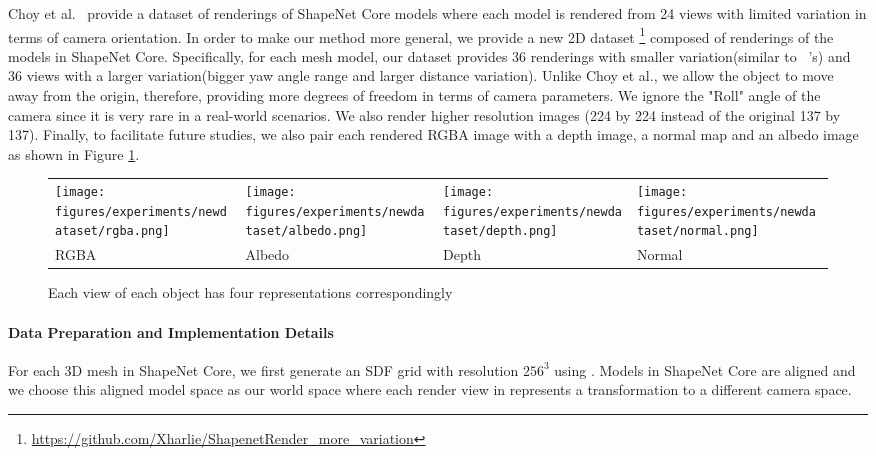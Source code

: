 \vspace{-5pt}
Choy et al.~\cite{choy20163d} provide a dataset of renderings of ShapeNet Core models where each model is rendered from 24 views with limited variation in terms of camera orientation. In order to make our method more general, we provide a new 2D dataset \footnote{\url{https://github.com/Xharlie/ShapenetRender_more_variation}} composed of renderings of the models in ShapeNet Core. Specifically, for each mesh model, our dataset provides 36 renderings with smaller variation(similar to ~\cite{choy20163d}'s) and 36 views with a larger variation(bigger yaw angle range and larger distance variation). Unlike Choy et al., we allow the object to move away from the origin, therefore, providing more degrees of freedom in terms of camera parameters. We ignore the "Roll" angle of the camera since it is very rare in a real-world scenarios. We also render higher resolution images (224 by 224 instead of the original 137 by 137). Finally, to facilitate future studies, we also pair each rendered RGBA image with a depth image, a normal map and an albedo image as shown in Figure \ref{fig:newdataset}.
\begin{figure}[htb!]
    \centering
    \hspace*{-0.5cm} 
    \renewcommand{\arraystretch}{1}
    \begin{tabular}{CCCC}
        \texttt{[image: figures/experiments/newdataset/rgba.png]}
        &\texttt{[image: figures/experiments/newdataset/albedo.png]}
        &\texttt{[image: figures/experiments/newdataset/depth.png]}
        &\texttt{[image: figures/experiments/newdataset/normal.png]}
    \\ \small{RGBA}& \small{Albedo} & \small{Depth} & \small{Normal}
    \end{tabular}
    \caption {Each view of each object has four representations correspondingly }
    \label{fig:newdataset} 
\end{figure}
\vspace{-15pt}
\vspace{-5pt}
\paragraph{Data Preparation and Implementation Details}
For each 3D mesh in ShapeNet Core, we first generate an SDF grid with resolution $256^3$ using \cite{xu2014signed, sin2013vega}. Models in ShapeNet Core are aligned and we choose this aligned model space as our world space where each render view in \cite{choy20163d} represents a transformation to a different camera space. 

